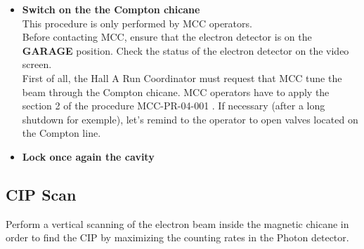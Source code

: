 {\begin{itemize}
 
\begin{figure}[htp]
    \begin{center}
        \texttt{[image: compton\_edet\_viewer]}
    \end{center}
    \caption[compton:Electron detector viewer]{Compton electron detector TV viewer in the Counting House backroom}
    \label{fig:compton_edet_viewer}
\end{figure}

	  
\item {\bf Switch on the the Compton chicane}\\

        This procedure is only performed by MCC operators.\\
        
 Before contacting MCC, ensure that the 
electron detector is on the {\bf GARAGE}  position.
Check the status of the electron detector on the video screen.\\

        First of all,
        the Hall A Run Coordinator must request that
        MCC tune the beam through the Compton chicane.
        MCC operators have to apply the section 2 of
        the procedure MCC-PR-04-001\cite{compton_beam_tune} . If necessary
       (after a long shutdown for exemple), let's remind to the operator
       to open valves located on the Compton line.
       
\item {\bf Lock once again the cavity}\\
\end{itemize}

\subsection{CIP Scan}
Perform a vertical scanning of the electron beam inside the magnetic chicane 
in order to find the CIP by maximizing the counting rates in the Photon detector.

}
